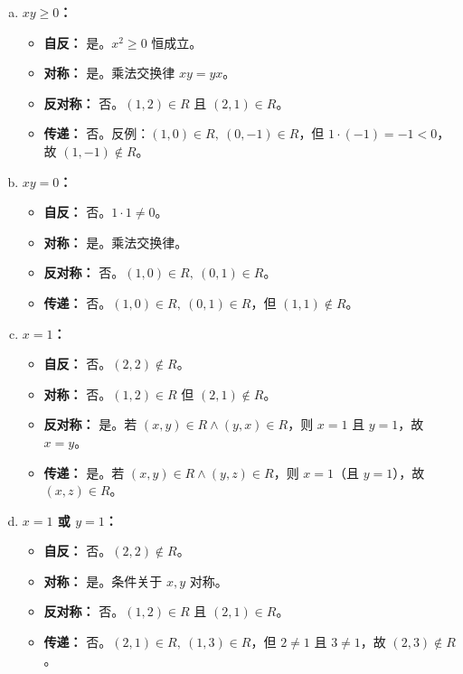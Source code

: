\documentclass[11pt,UTF8]{article}
\begin{document}
\begin{enumerate}[a)]
    \item \textbf{$xy \ge 0$：}
    \begin{itemize}
        \item \textbf{自反：} 是。$x^2 \ge 0$ 恒成立。
        \item \textbf{对称：} 是。乘法交换律 $xy = yx$。
        \item \textbf{反对称：} 否。$(1,2) \in R$ 且 $(2,1) \in R$。
        \item \textbf{传递：} 否。反例：$(1,0) \in R,\ (0,-1) \in R$，但 $1 \cdot (-1) = -1 < 0$，故 $(1,-1) \notin R$。
    \end{itemize}

    \item \textbf{$xy = 0$：}
    \begin{itemize}
        \item \textbf{自反：} 否。$1 \cdot 1 \neq 0$。
        \item \textbf{对称：} 是。乘法交换律。
        \item \textbf{反对称：} 否。$(1,0) \in R,\ (0,1) \in R$。
        \item \textbf{传递：} 否。$(1,0) \in R,\ (0,1) \in R$，但 $(1,1) \notin R$。
    \end{itemize}

    \item \textbf{$x = 1$：}
    \begin{itemize}
        \item \textbf{自反：} 否。$(2,2) \notin R$。
        \item \textbf{对称：} 否。$(1,2) \in R$ 但 $(2,1) \notin R$。
        \item \textbf{反对称：} 是。若 $(x,y) \in R \land (y,x) \in R$，则 $x=1$ 且 $y=1$，故 $x=y$。
        \item \textbf{传递：} 是。若 $(x,y) \in R \land (y,z) \in R$，则 $x=1$（且 $y=1$），故 $(x,z) \in R$。
    \end{itemize}

    \item \textbf{$x = 1$ 或 $y = 1$：}
    \begin{itemize}
        \item \textbf{自反：} 否。$(2,2) \notin R$。
        \item \textbf{对称：} 是。条件关于 $x,y$ 对称。
        \item \textbf{反对称：} 否。$(1,2) \in R$ 且 $(2,1) \in R$。
        \item \textbf{传递：} 否。$(2,1) \in R,\ (1,3) \in R$，但 $2 \neq 1$ 且 $3 \neq 1$，故 $(2,3) \notin R$。
    \end{itemize}
\end{enumerate}
\end{document}
